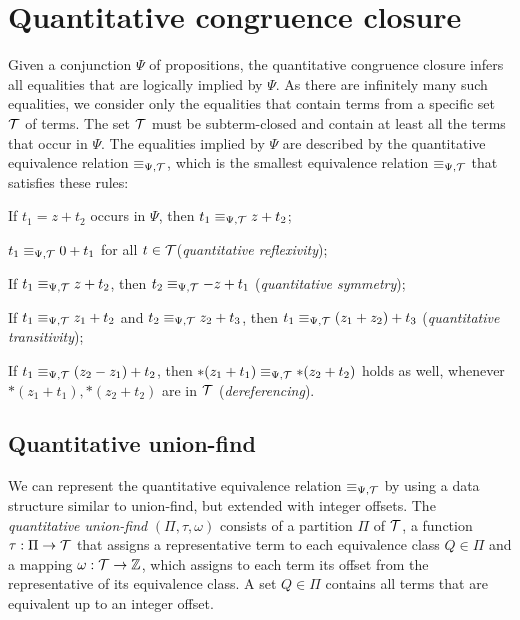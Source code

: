 \section{Quantitative congruence closure}

Given a conjunction $\Psi$ of propositions, the quantitative congruence closure infers all equalities that are logically implied by $\Psi$.
As there are infinitely many such equalities, we consider only the equalities that contain terms from a specific set $\mathcal{T}$ of terms.
The set $\mathcal{T}$ must be subterm-closed and contain at least all the terms that occur in $\Psi$.
The equalities implied by $\Psi$ are described by the quantitative equivalence relation $\equiv_{\Psi,\mathcal{T}}$,
which is the smallest equivalence relation $\equiv_{\Psi,\mathcal{T}}$ that satisfies these rules:
\begin{enumerate}[label={[E\arabic*]}, ref={[E\arabic*]}]
  \setcounter{enumi}{-1}
\item\label{item:persistence} If $t_1 = z+t_2$ occurs in $\Psi$, then $t_1 \equiv_{\Psi,\mathcal{T}} z+t_2$;
\item\label{item:quantitative-reflexivity} $t_1 \equiv_{\Psi,\mathcal{T}} 0+t_1$ for all $t\in\mathcal{T}$(\emph{quantitative reflexivity});
\item\label{item:quantitative-symmetry} If $t_1 \equiv_{\Psi,\mathcal{T}} z+t_2$, then $t_2 \equiv_{\Psi,\mathcal{T}} -z+t_1$ (\emph{quantitative symmetry});
\item\label{item:quantitative-transitivity} If $t_1 \equiv_{\Psi,\mathcal{T}} z_1+t_2$ and $t_2 \equiv_{\Psi,\mathcal{T}} z_2 + t_3$,
		then $t_1 \equiv_{\Psi,\mathcal{T}} (z_1+z_2)+t_3$ (\emph{quantitative transitivity});
\item\label{item:dereferencing} If $t_1 \equiv_{\Psi,\mathcal{T}} (z_2 - z_1) + t_2$, then $*(z_1 + t_1) \equiv_{\Psi,\mathcal{T}} *(z_2 + t_2)$ holds as well, whenever $*(z_1 + t_1),  *(z_2 + t_2)$ are in $\mathcal{T}$ (\emph{dereferencing}).
\end{enumerate}

\subsection{Quantitative union-find}

We can represent the quantitative equivalence relation $\equiv_{\Psi,\mathcal{T}}$ by using a data structure similar to union-find, but extended with integer offsets.
The \emph{quantitative union-find} $(\Pi, \tau, \omega)$ consists of a partition $\Pi$ of $\mathcal{T}$,
a function $\tau : \Pi \rightarrow \mathcal{T}$ that assigns a representative term to each equivalence class $Q \in \Pi$ and a mapping $\omega : \mathcal{T} \rightarrow \mathbb{Z}$,
which assigns to each term its offset from the representative of its equivalence class.
A set $Q \in \Pi$ contains all terms that are equivalent up to an integer offset.

